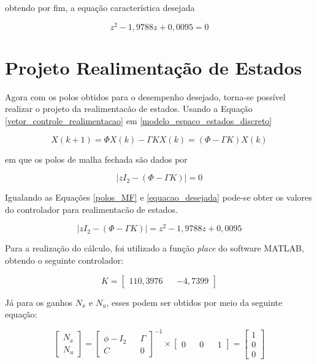 obtendo por fim, a equação característica desejada

\begin{equation}
    z^2-1,9788z+0,0095 = 0
    \label{equacao_desejada}
\end{equation}

\section{Projeto Realimentação de Estados}

Agora com os polos obtidos para o desempenho desejado, torna-se possível realizar o projeto da realimentacão de estados. Usando a Equação \ref{vetor_controle_realimentacao} em \ref{modelo_espaco_estados_discreto} 

\begin{equation}
     X(k+1) = \Phi X(k) - \varGamma KX(k) = (\Phi-\varGamma K)X(k)
     \label{modelo_espaco_estados_discreto2}
\end{equation}

\noindent em que os polos de malha fechada são dados por

\begin{equation}
    | z I_2 - (\Phi-\varGamma K) | = 0
    \label{polos_MF}
\end{equation}

Igualando as Equações \ref{polos_MF} e \ref{equacao_desejada} pode-se obter os valores do controlador para realimentacão de estados.

\begin{equation}
    | z I_2 - (\Phi-\varGamma K) | = z^2-1,9788z+0,0095
    \label{realimentacao_estados}
\end{equation}

Para a realização do cálculo, foi utilizado a função \textit{place} do software MATLAB, obtendo o seguinte controlador:

\begin{equation}
    K = 
    \begin{bmatrix}
        110,3976 && -4,7399
    \end{bmatrix}
    \label{controlador_realimentacao}
\end{equation}

Já para os ganhos $N_x$ e $N_u$, esses podem ser obtidos por meio da seguinte equação:

\begin{equation}
    \begin{bmatrix}
        N_x \\ N_u
    \end{bmatrix}
    =
    \begin{bmatrix}
        \phi-I_2 && \varGamma \\ C && 0
    \end{bmatrix}
    ^{-1}\times 
    \begin{bmatrix}
        0 && 0 && 1
    \end{bmatrix}
    =
    \begin{bmatrix}
        1 \\ 0 \\ 0
    \end{bmatrix}
    \label{ganhos_Nxu}
\end{equation}

